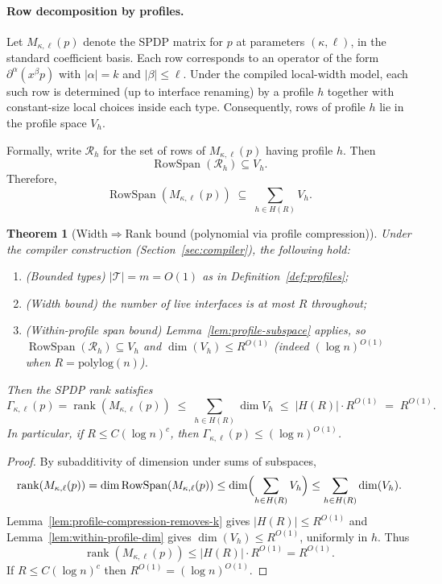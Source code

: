 \documentclass[12pt]{article}
\DeclareMathOperator{\rank}{rank}
\DeclareMathOperator{\RowSpan}{RowSpan}
\newtheorem{theorem}{Theorem}
\theoremstyle{definition}
\theoremstyle{definition}
\theoremstyle{remark}
\theoremstyle{remark}
\begin{document}
\paragraph{Row decomposition by profiles.}
Let $M_{\kappa,\ell}(p)$ denote the SPDP matrix for $p$ at parameters $(\kappa,\ell)$, in the
standard coefficient basis. Each row corresponds to an operator of the form
$\partial^\alpha(x^\beta p)$ with $|\alpha|=k$ and $|\beta|\le \ell$.
Under the compiled local-width model, each such row is determined (up to interface
renaming) by a profile $h$ together with constant-size local choices inside each type.
Consequently, rows of profile $h$ lie in the profile space $V_h$.

Formally, write $\mathcal{R}_h$ for the set of rows of $M_{\kappa,\ell}(p)$ having profile
$h$. Then
\[
  \RowSpan(\mathcal{R}_h)\subseteq V_h.
\]
Therefore,
\[
  \RowSpan(M_{\kappa,\ell}(p))
  \;\subseteq\;
  \sum_{h\in H(R)} V_h.
\]

\begin{theorem}[Width$\Rightarrow$Rank bound (polynomial via profile compression)]
\label{thm:width-implies-rank}
Under the compiler construction (Section~\ref{sec:compiler}), the following hold:
\begin{enumerate}
  \item (Bounded types) $|\mathcal{T}|=m=O(1)$ as in Definition~\ref{def:profiles};
  \item (Width bound) the number of live interfaces is at most $R$ throughout;
  \item (Within-profile span bound) Lemma~\ref{lem:profile-subspace} applies, so
        $\RowSpan(\mathcal{R}_h)\subseteq V_h$ and $\dim(V_h)\le R^{O(1)}$
        (indeed $(\log n)^{O(1)}$ when $R=\mathrm{polylog}(n)$).
\end{enumerate}
Then the SPDP rank satisfies
\[
  \Gamma_{\kappa,\ell}(p) = \rank(M_{\kappa,\ell}(p))
  \;\le\;
  \sum_{h\in H(R)} \dim V_h
  \;\le\;
  |H(R)|\cdot R^{O(1)}
  \;=\;
  R^{O(1)}.
\]
In particular, if $R\le C(\log n)^c$, then $\Gamma_{\kappa,\ell}(p)\le (\log n)^{O(1)}$.
\end{theorem}

\begin{proof}
By subadditivity of dimension under sums of subspaces,
\[
  \rank(M_{\kappa,\ell}(p))
  =
  \dim\RowSpan(M_{\kappa,\ell}(p))
  \le
  \dim\Bigl(\sum_{h\in H(R)} V_h\Bigr)
  \le
  \sum_{h\in H(R)} \dim(V_h).
\]
Lemma~\ref{lem:profile-compression-removes-k} gives $|H(R)|\le R^{O(1)}$ and
Lemma~\ref{lem:within-profile-dim} gives $\dim(V_h)\le R^{O(1)}$, uniformly in $h$.
Thus
\[
  \rank(M_{\kappa,\ell}(p))
  \le
  |H(R)|\cdot R^{O(1)}
  =
  R^{O(1)}.
\]
If $R\le C(\log n)^c$ then $R^{O(1)}=(\log n)^{O(1)}$.
\end{proof}
\end{document}
